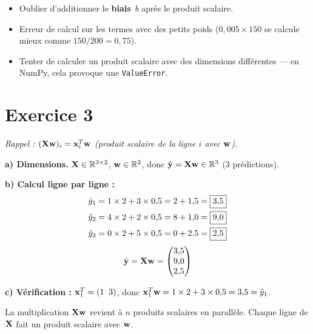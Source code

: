 \begin{attentionbox}
    \begin{itemize}
        \item Oublier d'additionner le \textbf{biais}~$b$ apr\`{e}s le produit scalaire.
        \item Erreur de calcul sur les termes avec des petits poids ($0{,}005 \times 150$ se calcule mieux comme $150 / 200 = 0{,}75$).
        \item Tenter de calculer un produit scalaire avec des dimensions diff\'{e}rentes --- en NumPy, cela provoque une \texttt{ValueError}.
    \end{itemize}
\end{attentionbox}

\section*{Exercice 3 \hfill \exofondamental}
\textit{Rappel : $(\mathbf{X}\mathbf{w})_i = \mathbf{x}_i^T \mathbf{w}$ (produit scalaire de la ligne $i$ avec $\mathbf{w}$).}

\separateur

\textbf{a) Dimensions.}
$\mathbf{X} \in \mathbb{R}^{3 \times 2}$, $\mathbf{w} \in \mathbb{R}^{2}$,
donc $\hat{\mathbf{y}} = \mathbf{X}\mathbf{w} \in \mathbb{R}^{3}$ (3 pr\'{e}dictions).

\textbf{b) Calcul ligne par ligne :}
\begin{align*}
    \hat{y}_1 &= 1 \times 2 + 3 \times 0{,}5 = 2 + 1{,}5 = \boxed{3{,}5} \\
    \hat{y}_2 &= 4 \times 2 + 2 \times 0{,}5 = 8 + 1{,}0 = \boxed{9{,}0} \\
    \hat{y}_3 &= 0 \times 2 + 5 \times 0{,}5 = 0 + 2{,}5 = \boxed{2{,}5}
\end{align*}
\[
    \hat{\mathbf{y}} = \mathbf{X}\mathbf{w} = \begin{pmatrix} 3{,}5 \\ 9{,}0 \\ 2{,}5 \end{pmatrix}
\]

\textbf{c) V\'{e}rification :}
$\mathbf{x}_1^T = (1 \;\; 3)$, donc $\mathbf{x}_1^T \mathbf{w} = 1 \times 2 + 3 \times 0{,}5 = 3{,}5 = \hat{y}_1$. \checkmark

\begin{retenirbox}
    La multiplication $\mathbf{X}\mathbf{w}$ revient \`{a} $n$ produits scalaires en parall\`{e}le.
    Chaque ligne de $\mathbf{X}$ fait un produit scalaire avec $\mathbf{w}$.
\end{retenirbox}

